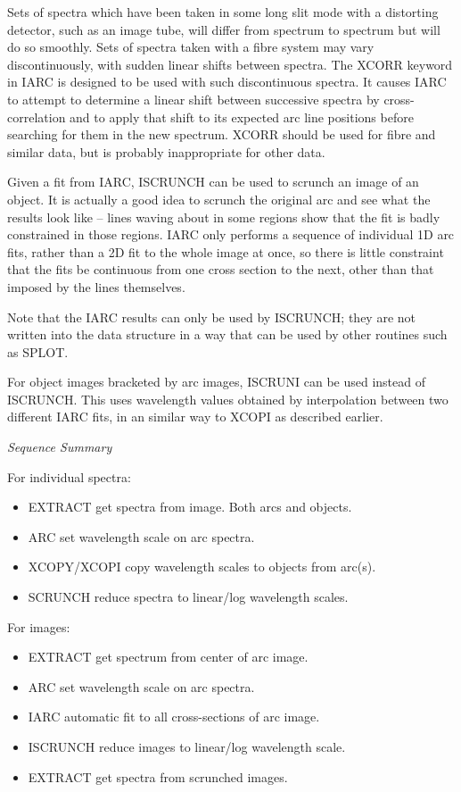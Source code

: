 Sets of spectra which have been taken in some long slit mode with a
distorting detector, such as an image tube, will differ from spectrum to 
spectrum but will do so smoothly.  Sets of spectra taken with a fibre system
may vary discontinuously, with sudden linear shifts between spectra.  The
XCORR keyword in IARC is designed to be used with such discontinuous
spectra.  It causes IARC to attempt to determine a linear shift between
successive spectra by cross-correlation and to apply that shift to its
expected arc line positions before searching for them in the new spectrum.
XCORR should be used for fibre and similar data, but is probably inappropriate
for other data.

Given a fit from IARC, ISCRUNCH can be used to scrunch an 
image of an object.
It is actually a good idea to scrunch the original arc and see what the
results look like -- lines waving about in some regions show that the fit
is badly constrained in those regions.  IARC only performs a sequence of
individual 1D arc fits, rather than a 2D fit to the whole image at once,
so there is little constraint that the fits be continuous from one cross
section to the next, other than that imposed by the lines themselves.

Note that the IARC results can only be used by ISCRUNCH; they are not
written into the data structure in a way that can be used by other routines
such as SPLOT.

For object images bracketed by arc images, ISCRUNI can be used 
instead of ISCRUNCH.  This uses wavelength values obtained by interpolation
between two different IARC fits, in an similar way to XCOPI as described
earlier.


\goodbreak
\vspace{12pt}
{\it Sequence Summary}

For individual spectra:

\begin{itemize}
\item EXTRACT       get spectra from image.  Both arcs and objects.
\item ARC           set wavelength scale on arc spectra.
\item XCOPY/XCOPI   copy wavelength scales to objects from arc(s).
\item SCRUNCH       reduce spectra to linear/log wavelength scales.
\end{itemize}

For images:

\begin{itemize}
\item EXTRACT       get spectrum from center of arc image.
\item ARC           set wavelength scale on arc spectra.
\item IARC          automatic fit to all cross-sections of arc image.
\item ISCRUNCH      reduce images to linear/log wavelength scale.
\item EXTRACT       get spectra from scrunched images.
\end{itemize}


